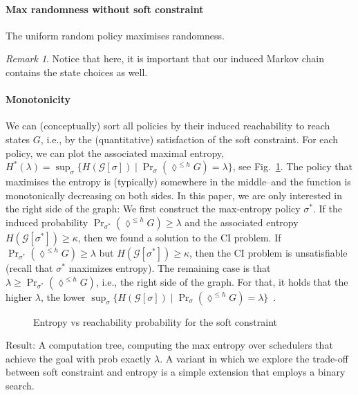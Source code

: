 \documentclass[conference]{IEEEtran}
\theoremstyle{remark}
\newtheorem{remark}{Remark}
\newcommand{\sg}{\mathcal{G}}
\newcommand{\eventually}[1]{\lozenge^{\leq #1}}
\newcommand{\sched}{\sigma}
\begin{document}
\paragraph{Max randomness without soft constraint}
The uniform random policy maximises randomness.
\begin{remark}
Notice that here, it is important that our induced Markov chain contains the state choices as well.	
\end{remark}


\paragraph{Monotonicity}
We can (conceptually) sort all policies by their induced reachability to reach states $G$, i.e., by the (quantitative) satisfaction of the soft constraint. For each policy, we can plot the associated maximal entropy, $H^*(\lambda) = \sup_{\sched} \{ H(\sg[\sched]) \mid \Pr_{\sched}(\eventually{h} G) = \lambda\}$, see Fig.~\ref{fig:entropyvspsat}.
The policy that maximises the entropy is (typically) somewhere in the middle--and the function is monotonically decreasing on both sides. 
In this paper, we are only interested in the right side of the graph:
We first construct the max-entropy policy $\sched^*$. If the induced probability $\Pr_{\sched^*}(\eventually{h} G) \geq \lambda$ and the associated entropy $H(\sg[\sched^*]) \geq \kappa$, then we found a solution to the CI problem. If $\Pr_{\sched^*}(\eventually{h} G) \geq \lambda$ but $H(\sg[\sched^*]) \geq \kappa$, then the CI problem is unsatisfiable (recall that $\sched^*$ maximizes entropy).
The remaining case is that $\lambda \geq \Pr_{\sched^*}(\eventually{h} G)$, i.e., the right side of the graph.
For that, it holds that the higher $\lambda$, the lower $\sup_{\sched} \{ H(\sg[\sched]) \mid \Pr_{\sched}(\eventually{h} G) = \lambda\}$~. 
\begin{figure}
\label{fig:entropyvspsat}
\caption{Entropy vs reachability probability for the soft constraint}
\end{figure}
Result: A computation tree, computing the max entropy over schedulers that achieve the goal with prob exactly $\lambda$.
A variant in which we explore the trade-off between soft constraint and entropy is a simple extension that employs a binary search.
\end{document}
